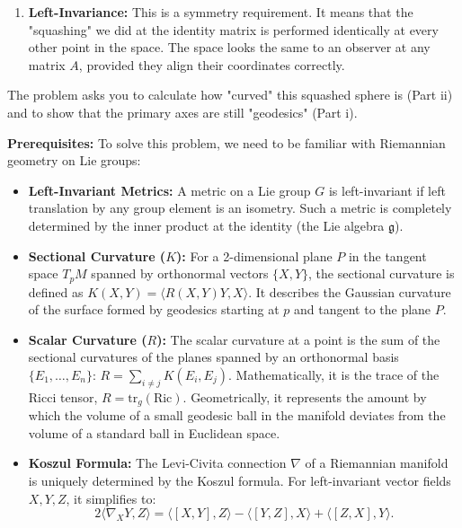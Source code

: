 \begin{solution}
\begin{enumerate}
\begin{itemize}
        \begin{equation*}
            g_\epsilon = \epsilon^2 \omega^1 \otimes \omega^1 + \omega^2 \otimes \omega^2 + \omega^3 \otimes \omega^3
        \end{equation*}
        \item \textbf{Geometric Result:} If $\epsilon = 1$, we recover the standard "round" metric on $S^3$. If $\epsilon \neq 1$, the sphere becomes "ellipsoidal" or "squashed" along the Hopf fibers.
    \end{itemize}
    \item \textbf{Left-Invariance:} This is a symmetry requirement. It means that the "squashing" we did at the identity matrix is performed identically at every other point in the space. The space looks the same to an observer at any matrix $A$, provided they align their coordinates correctly.
\end{enumerate}
The problem asks you to calculate how "curved" this squashed sphere is (Part ii) and to show that the primary axes are still "geodesics" (Part i).

\textbf{Prerequisites:}
To solve this problem, we need to be familiar with Riemannian geometry on Lie groups:
\begin{itemize}
    \item \textbf{Left-Invariant Metrics:} A metric on a Lie group $G$ is left-invariant if left translation by any group element is an isometry. Such a metric is completely determined by the inner product at the identity (the Lie algebra $\mathfrak{g}$).
    \item \textbf{Sectional Curvature ($K$):} For a 2-dimensional plane $P$ in the tangent space $T_pM$ spanned by orthonormal vectors $\{X, Y\}$, the sectional curvature is defined as $K(X, Y) = \langle R(X, Y)Y, X \rangle$. It describes the Gaussian curvature of the surface formed by geodesics starting at $p$ and tangent to the plane $P$.
    \item \textbf{Scalar Curvature ($R$):} The scalar curvature at a point is the sum of the sectional curvatures of the planes spanned by an orthonormal basis $\{E_1, \dots, E_n\}$: $R = \sum_{i \neq j} K(E_i, E_j)$. Mathematically, it is the trace of the Ricci tensor, $R = \text{tr}_g(\text{Ric})$. Geometrically, it represents the amount by which the volume of a small geodesic ball in the manifold deviates from the volume of a standard ball in Euclidean space.
    \item \textbf{Koszul Formula:} The Levi-Civita connection $\nabla$ of a Riemannian manifold is uniquely determined by the Koszul formula. For left-invariant vector fields $X, Y, Z$, it simplifies to:
    \[ 2\langle \nabla_X Y, Z \rangle = \langle [X, Y], Z \rangle - \langle [Y, Z], X \rangle + \langle [Z, X], Y \rangle. \]
\end{itemize}


\end{solution}
